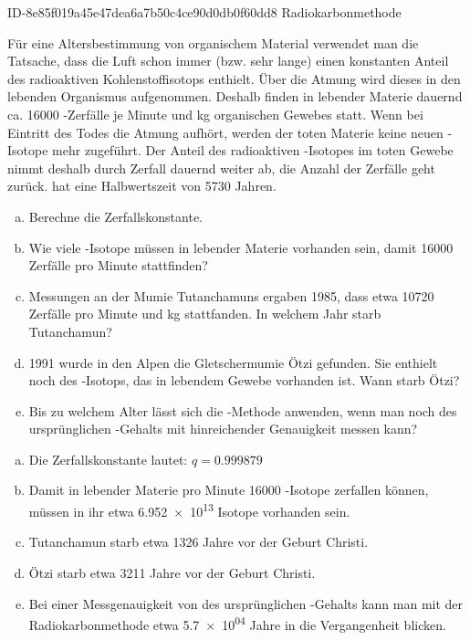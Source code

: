 \begin{exercise}
      {ID-8e85f019a45e47dea6a7b50c4ce90d0db0f60dd8}
      {Radiokarbonmethode}
  \ifproblem\problem\par
    Für eine Altersbestimmung von organischem Material verwendet
    man die Tatsache, dass die Luft schon immer (bzw. sehr lange)
    einen konstanten Anteil des radioaktiven Kohlenstoffisotops
     enthielt. Über die Atmung wird dieses in den
    lebenden Organismus aufgenommen. Deshalb finden in lebender
    Materie dauernd ca. \num{16000} -Zerfälle je Minute
    und \si{\kilo\gram} organischen Gewebes statt. Wenn bei
    Eintritt des Todes die Atmung aufhört, werden der toten
    Materie keine neuen -Isotope mehr zugeführt.
    Der Anteil des radioaktiven -Isotopes im toten
    Gewebe nimmt deshalb durch Zerfall dauernd weiter ab, die
    Anzahl der Zerfälle geht zurück.  hat eine
    Halbwertszeit von \num{5730} Jahren.
    \begin{enumerate}[a)]
      \item Berechne die Zerfallskonstante.
      \item Wie viele -Isotope müssen in 
            lebender Materie vorhanden sein, damit \num{16000}
            Zerfälle pro Minute stattfinden?
      \item Messungen an der Mumie Tutanchamuns ergaben
            1985, dass etwa \num{10720} Zerfälle pro Minute
            und \si{\kilo\gram} stattfanden. In welchem Jahr
            starb Tutanchamun?
      \item 1991 wurde in den Alpen die Gletschermumie
            \glqq Ötzi\grqq{} gefunden. Sie enthielt noch 
            des -Isotops, das in lebendem Gewebe
            vorhanden ist. Wann starb \glqq Ötzi\grqq?
      \item Bis zu welchem Alter lässt sich die
            -Methode anwenden, wenn man noch
             des ursprünglichen -Gehalts
            mit hinreichender Genauigkeit messen kann?
    \end{enumerate}
  \fi
  \ifoutcome\outcome\par
    \begin{enumerate}[a)]
      \item Die Zerfallskonstante lautet: $q=\num{0.999879}$
      \item Damit in  lebender Materie pro Minute \num{16000}
            -Isotope zerfallen können, müssen
            in ihr etwa \num{6.952e+13} Isotope vorhanden sein.
      \item Tutanchamun starb etwa \num{1326} Jahre vor der
            Geburt Christi.
      \item Ötzi starb etwa \num{3211} Jahre vor der Geburt Christi.
      \item Bei einer Messgenauigkeit von  des ursprünglichen
            -Gehalts kann man mit der Radiokarbonmethode
            etwa \num{5.7e+04} Jahre in die Vergangenheit blicken.
    \end{enumerate}
  \fi
\end{exercise}
